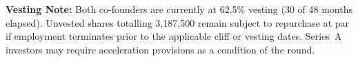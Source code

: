 \vspace{6pt}

\begin{tcolorbox}[warnbox]
  \small
  \caution\textbf{Vesting Note:} Both co-founders are currently at 62.5\% vesting (30 of 48
  months elapsed). Unvested shares totalling 3{,}187{,}500 remain subject to repurchase at
  par if employment terminates prior to the applicable cliff or vesting dates. Series~A
  investors may require acceleration provisions as a condition of the round.
\end{tcolorbox}
